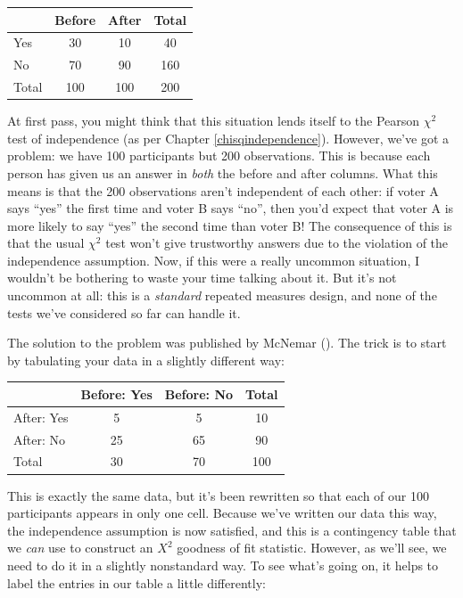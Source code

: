 \documentclass[
  11pt,
  a4paper,
  twoside,symmetric,openright]{book}
\theoremstyle{break}
\theoremstyle{break}
\begin{document}
\begin{longtable}[]{@{}lccc@{}}
\toprule\noalign{}
& Before & After & Total \\
\midrule\noalign{}
\endhead
\bottomrule\noalign{}
\endlastfoot
Yes & 30 & 10 & 40 \\
No & 70 & 90 & 160 \\
Total & 100 & 100 & 200 \\
\end{longtable}

At first pass, you might think that this situation lends itself to the Pearson \(\chi^2\) test of independence (as per Chapter \ref{chisqindependence}). However, we've got a problem: we have 100 participants but 200 observations. This is because each person has given us an answer in \emph{both} the before and after columns. What this means is that the 200 observations aren't independent of each other: if voter A says ``yes'' the first time and voter B says ``no'', then you'd expect that voter A is more likely to say ``yes'' the second time than voter B! The consequence of this is that the usual \(\chi^2\) test won't give trustworthy answers due to the violation of the independence assumption. Now, if this were a really uncommon situation, I wouldn't be bothering to waste your time talking about it. But it's not uncommon at all: this is a \emph{standard} repeated measures design, and none of the tests we've considered so far can handle it.

The solution to the problem was published by McNemar (). The trick is to start by tabulating your data in a slightly different way:

\begin{longtable}[]{@{}lccc@{}}
\toprule\noalign{}
& Before: Yes & Before: No & Total \\
\midrule\noalign{}
\endhead
\bottomrule\noalign{}
\endlastfoot
After: Yes & 5 & 5 & 10 \\
After: No & 25 & 65 & 90 \\
Total & 30 & 70 & 100 \\
\end{longtable}

This is exactly the same data, but it's been rewritten so that each of our 100 participants appears in only one cell. Because we've written our data this way, the independence assumption is now satisfied, and this is a contingency table that we \emph{can} use to construct an \(X^2\) goodness of fit statistic. However, as we'll see, we need to do it in a slightly nonstandard way. To see what's going on, it helps to label the entries in our table a little differently:
\end{document}
